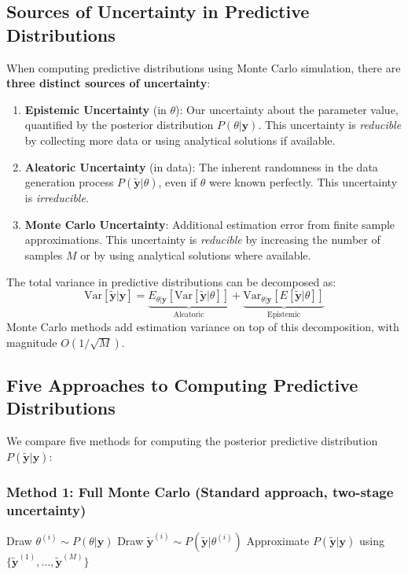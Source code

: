 \subsection{Sources of Uncertainty in Predictive Distributions}
When computing predictive distributions using Monte Carlo simulation, there are \textbf{three distinct sources of uncertainty}:
\begin{enumerate}
\item \textbf{Epistemic Uncertainty} (in $\theta$): Our uncertainty about the parameter value, quantified by the posterior distribution $P(\theta|\mathbf{y})$. This uncertainty is \emph{reducible} by collecting more data or using analytical solutions if available.
\item \textbf{Aleatoric Uncertainty} (in data): The inherent randomness in the data generation process $P(\tilde{\mathbf{y}}|\theta)$, even if $\theta$ were known perfectly. This uncertainty is \emph{irreducible}.
\item \textbf{Monte Carlo Uncertainty}: Additional estimation error from finite sample approximations. This uncertainty is \emph{reducible} by increasing the number of samples $M$ or by using analytical solutions where available.
\end{enumerate}
The total variance in predictive distributions can be decomposed as:
\begin{equation}
\boxed{\text{Var}[\tilde{\mathbf{y}}|\mathbf{y}] = \underbrace{E_{\theta|\mathbf{y}}[\text{Var}[\tilde{\mathbf{y}}|\theta]]}_{\text{Aleatoric}} + \underbrace{\text{Var}_{\theta|\mathbf{y}}[E[\tilde{\mathbf{y}}|\theta]]}_{\text{Epistemic}}}
\end{equation}
Monte Carlo methods add estimation variance on top of this decomposition, with magnitude $O(1/\sqrt{M})$.

\subsection{Five Approaches to Computing Predictive Distributions}
We compare five methods for computing the posterior predictive distribution $P(\tilde{\mathbf{y}}|\mathbf{y})$:

\subsubsection*{Method 1: Full Monte Carlo (Standard approach, two-stage uncertainty)}
\begin{algorithmbox}
\begin{algorithm}[H]
\begin{algorithmic}[1]
    \State Draw $\theta^{(i)} \sim P(\theta|\mathbf{y})$ 
    \State Draw $\tilde{\mathbf{y}}^{(i)} \sim P(\tilde{\mathbf{y}}|\theta^{(i)})$ 
\EndFor
\State Approximate $P(\tilde{\mathbf{y}}|\mathbf{y})$ using $\{\tilde{\mathbf{y}}^{(1)}, \dots, \tilde{\mathbf{y}}^{(M)}\}$
\end{algorithmic}
\end{algorithm}
\end{algorithmbox}


